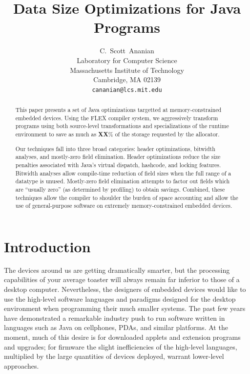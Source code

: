 \documentclass[preprint]{acmconf}
\title{\bf Data Size Optimizations for Java Programs}
\author{C.~Scott~Ananian \\
	Laboratory for Computer Science\\
	Massachusetts Institute of Technology\\ 
	Cambridge, MA 02139 \\ 
	{\tt cananian@lcs.mit.edu} }
\begin{document}
\pagestyle{myheadings}


\maketitle

\begin{abstract}

This paper presents a set of Java optimizations targetted at
memory-constrained embedded devices.  Using the FLEX compiler system,
we aggressively transform
programs using both source-level transformations and
specializations of the runtime environment to save as much
as {\bf XX}\% of the storage requested by the allocator.

Our techniques fall into three broad categories: header optimizations,
bitwidth analyses, and mostly-zero field elimination.  Header
optimizations reduce the size penalties associated with 
Java's virtual dispatch, hashcode, and locking features.  Bitwidth
analyses allow compile-time reduction of field sizes when the
full range of a datatype is unused.  Mostly-zero field elimination
attempts to factor out fields which are ``usually zero'' (as
determined by profiling) to obtain savings.  Combined, these
techniques allow the compiler to shoulder the burden of space accounting
and allow the use of general-purpose software on extremely
memory-constrained embedded devices.

\end{abstract}

\section{Introduction}
The devices around us are getting dramatically smarter, but the
processing capabilities of your average toaster will always remain far
inferior to those of a desktop computer.  Nevertheless, the designers
of embedded devices would like to use the high-level software
languages and paradigms designed for the desktop environment when
programming their much smaller systems.  The past few years have
demonstrated a remarkable industry push to run software written in
languages such as Java on cellphones, PDAs, and similar platforms.
At the moment, much of this desire is for downloaded applets and
extension programs and upgrades; for firmware the slight
inefficiencies of the high-level languages, multiplied by the large
quantities of devices deployed, warrant lower-level approaches.
\end{document}
